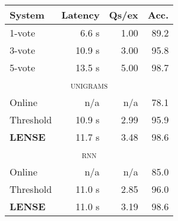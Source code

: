 \begin{tabular}{l r  r  r}
    \textbf{System} & \textbf{Latency} & \textbf{Qs/ex} & \textbf{Acc.} \\ \hline
    1-vote & 6.6 s & 1.00 & 89.2 \\ %
    3-vote & 10.9 s & 3.00 & 95.8 \\ %
    5-vote & 13.5 s & 5.00 & 98.7 \\ %
    \multicolumn{4}{c}{\textsc{unigrams}} \\ \hline
    Online & n/a & n/a & 78.1 \\ %
    Threshold & 10.9 s & 2.99 & 95.9 \\ %
    \textbf{LENSE} & 11.7 s & 3.48 & 98.6 \\ %
    \multicolumn{4}{c}{\textsc{rnn}} \\ \hline
    Online & n/a & n/a & 85.0 \\ %
    Threshold & 11.0 s & 2.85 & 96.0 \\ %
    \textbf{LENSE} & 11.0 s & 3.19 & 98.6 \\%
\end{tabular}
